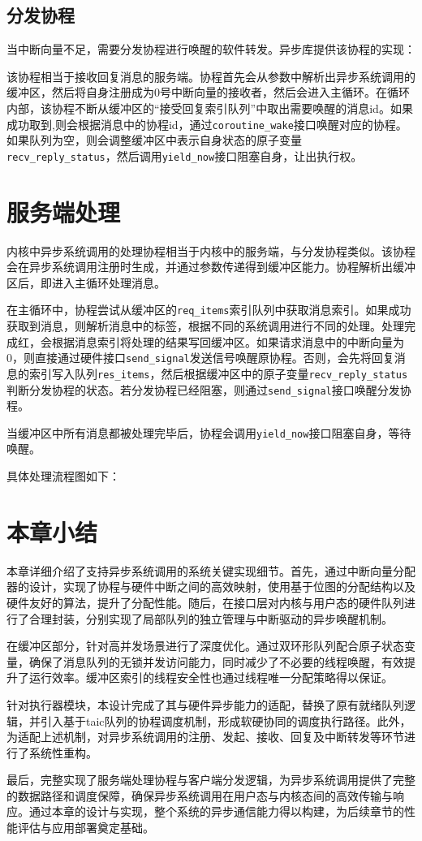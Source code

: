 \subsection{分发协程}
当中断向量不足，需要分发协程进行唤醒的软件转发。异步库提供该协程的实现：

该协程相当于接收回复消息的服务端。协程首先会从参数中解析出异步系统调用的缓冲区，然后将自身注册成为0号中断向量的接收者，然后会进入主循环。在循环内部，该协程不断从缓冲区的“接受回复索引队列”中取出需要唤醒的消息id。如果成功取到,则会根据消息中的协程id，通过\texttt{coroutine\_wake}接口唤醒对应的协程。如果队列为空，则会调整缓冲区中表示自身状态的原子变量
\texttt{recv\_reply\_status}，然后调用\texttt{yield\_now}接口阻塞自身，让出执行权。

\section{服务端处理}

内核中异步系统调用的处理协程相当于内核中的服务端，与分发协程类似。该协程会在异步系统调用注册时生成，并通过参数传递得到缓冲区能力。协程解析出缓冲区后，即进入主循环处理消息。

在主循环中，协程尝试从缓冲区的\texttt{req\_items}索引队列中获取消息索引。如果成功获取到消息，则解析消息中的标签，根据不同的系统调用进行不同的处理。处理完成红，会根据消息索引将处理的结果写回缓冲区。如果请求消息中的中断向量为0，则直接通过硬件接口\texttt{send\_signal}发送信号唤醒原协程。否则，会先将回复消息的索引写入队列\texttt{res\_items}，然后根据缓冲区中的原子变量\texttt{recv\_reply\_status}判断分发协程的状态。若分发协程已经阻塞，则通过\texttt{send\_signal}接口唤醒分发协程。

当缓冲区中所有消息都被处理完毕后，协程会调用\texttt{yield\_now}接口阻塞自身，等待唤醒。

具体处理流程图如下：


\section{本章小结}

本章详细介绍了支持异步系统调用的系统关键实现细节。首先，通过中断向量分配器的设计，实现了协程与硬件中断之间的高效映射，使用基于位图的分配结构以及硬件友好的算法，提升了分配性能。随后，在接口层对内核与用户态的硬件队列进行了合理封装，分别实现了局部队列的独立管理与中断驱动的异步唤醒机制。

在缓冲区部分，针对高并发场景进行了深度优化。通过双环形队列配合原子状态变量，确保了消息队列的无锁并发访问能力，同时减少了不必要的线程唤醒，有效提升了运行效率。缓冲区索引的线程安全性也通过线程唯一分配策略得以保证。

针对执行器模块，本设计完成了其与硬件异步能力的适配，替换了原有就绪队列逻辑，并引入基于taic队列的协程调度机制，形成软硬协同的调度执行路径。此外，为适配上述机制，对异步系统调用的注册、发起、接收、回复及中断转发等环节进行了系统性重构。

最后，完整实现了服务端处理协程与客户端分发逻辑，为异步系统调用提供了完整的数据路径和调度保障，确保异步系统调用在用户态与内核态间的高效传输与响应。通过本章的设计与实现，整个系统的异步通信能力得以构建，为后续章节的性能评估与应用部署奠定基础。